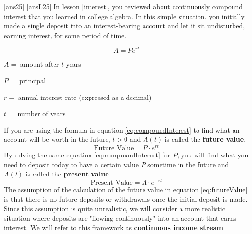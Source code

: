 \newpage
[ans25]
[ansL25]
\noindent In lesson \ref{interest}, you reviewed about continuously compound interest that you learned in college algebra. In this simple situation, you initially made a single deposit into an interest-bearing account and let it sit undisturbed, earning interest, for some period of time. 

\begin{tcolorbox}[title = {Recall Compounded Continuously}]
\begin{equation}\label{eq:compoundInterest}
    A = Pe^{rt}
\end{equation}

$A = $ amount after $t$ years

$P=$ principal

$r=$ annual interest rate (expressed as a decimal)

$t=$ number of years\\
\end{tcolorbox}
\noindent If you are using the formula in equation \ref{eq:compoundInterest} to find what an account will be worth in the future, $t > 0$ and $A(t)$ is called the \textbf{future value}.\\
\begin{equation}\label{eq:futureValue}
    \text{Future Value}=P\cdot e^{rt}
\end{equation}
By solving the same equation \ref{eq:compoundInterest} for $P$, you will find what you need to deposit today to have a certain value $P$ sometime in the future and $A(t)$ is called the \textbf{present value}.
\begin{equation}
    \text{Present Value}=A\cdot e^{-rt}
\end{equation}
The assumption of the calculation of the future value in equation \ref{eq:futureValue} is that there is no future deposits or withdrawals once the initial deposit is made. Since this assumption is quite unrealistic, we will consider a more realistic situation where deposits are "flowing continuously" into an account that earns interest. We will refer to this framework as \textbf{continuous income stream}


